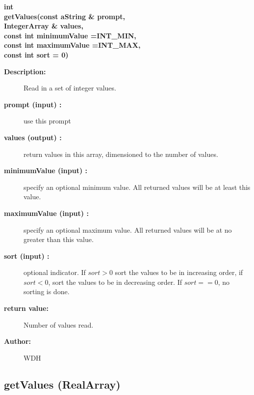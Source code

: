 \begin{flushleft} \textbf{%
int  \\ 
\settowidth{\GenericGraphicsInterfaceIncludeArgIndent}{getValues(}%
getValues(const aString \& prompt, \\ 
\hspace{\GenericGraphicsInterfaceIncludeArgIndent}IntegerArray \& values,\\ 
\hspace{\GenericGraphicsInterfaceIncludeArgIndent}const int minimumValue  =INT\_MIN, \\ 
\hspace{\GenericGraphicsInterfaceIncludeArgIndent}const int maximumValue  =INT\_MAX,\\ 
\hspace{\GenericGraphicsInterfaceIncludeArgIndent}const int sort  = 0)
}\end{flushleft}
\begin{description}
\item[{\bf Description:}] 
    Read in a set of integer values.
\item[{\bf prompt (input) :}]  use this prompt
\item[{\bf values (output) :}]  return values in this array, dimensioned to the number of values.
\item[{\bf minimumValue (input) :}]  specify an optional minimum value. All returned values will be at least this value.
\item[{\bf maximumValue (input) :}]  specify an optional maximum value. All returned values will be at no greater than
        this value.
\item[{\bf sort (input) :}]  optional indicator. If $sort>0$  sort the values to be in increasing order, if $sort<0$,
    sort the values to be in decreasing order. If $sort==0$, no sorting is done.
\item[{\bf return value:}]   Number of values read.
\item[{\bf Author:}]  WDH
\end{description}
\subsection{getValues (RealArray)}
 
